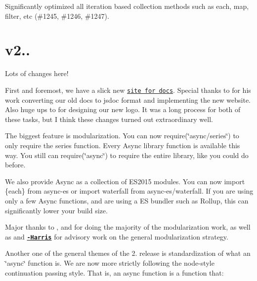 
\begin{DoxyItemize}
\item Significantly optimized all iteration based collection methods such as {\ttfamily each}, {\ttfamily map}, {\ttfamily filter}, etc (\#1245, \#1246, \#1247).
\end{DoxyItemize}

\section*{v2..}

Lots of changes here!

First and foremost, we have a slick new \href{https://caolan.github.io/async/}{\tt site for docs}. Special thanks to \href{https://github.com/hargasinski}{\tt {\bfseries }} for his work converting our old docs to {\ttfamily jsdoc} format and implementing the new website. Also huge ups to \href{https://github.com/ivanseidel}{\tt {\bfseries }} for designing our new logo. It was a long process for both of these tasks, but I think these changes turned out extraordinary well.

The biggest feature is modularization. You can now {\ttfamily require(\char`\"{}async/series\char`\"{})} to only require the {\ttfamily series} function. Every Async library function is available this way. You still can {\ttfamily require(\char`\"{}async\char`\"{})} to require the entire library, like you could do before.

We also provide Async as a collection of E\+S2015 modules. You can now {\ttfamily import \{each\} from \textquotesingle{}async-\/es\textquotesingle{}} or {\ttfamily import waterfall from \textquotesingle{}async-\/es/waterfall\textquotesingle{}}. If you are using only a few Async functions, and are using a ES bundler such as Rollup, this can significantly lower your build size.

Major thanks to \href{github.com/Kikobeats}{\tt {\bfseries }}, \href{github.com/aearly}{\tt {\bfseries }} and \href{github.com/megawac}{\tt {\bfseries }} for doing the majority of the modularization work, as well as \href{github.com/jdalton}{\tt {\bfseries }} and \href{github.com/Rich-Harris}{\tt {\bfseries -\/\+Harris}} for advisory work on the general modularization strategy.

Another one of the general themes of the 2. release is standardization of what an \char`\"{}async\char`\"{} function is. We are now more strictly following the node-\/style continuation passing style. That is, an async function is a function that\+:


